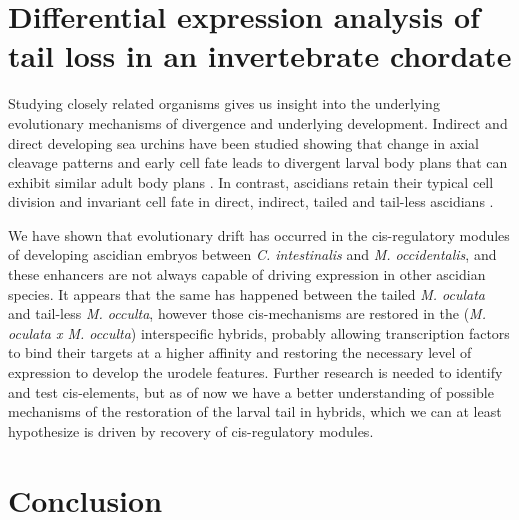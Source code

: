 \section{Differential expression analysis of tail loss in an invertebrate chordate}
Studying closely related organisms gives us insight into the underlying evolutionary mechanisms of divergence and underlying development. Indirect and direct developing sea urchins have been studied showing that change in axial cleavage patterns and early cell fate leads to divergent larval body plans that can exhibit similar adult body plans \cite{wray_evolutionary_1989,henry_evolutionary_1990}. In contrast, ascidians retain their typical cell division and invariant cell fate in direct, indirect, tailed and tail-less ascidians \cite{jeffery_evolutionary_1991,maliska_molgula_2010}. 
   
We have shown that evolutionary drift has occurred in the cis-regulatory modules of developing ascidian embryos between \textit{C. intestinalis} and \textit{M. occidentalis}, and these enhancers are not always capable of driving expression in other ascidian species. It appears that the same has happened between the tailed \textit{M. oculata} and tail-less \textit{M. occulta}, however those cis-mechanisms are restored in the (\textit{M. oculata x M. occulta}) interspecific hybrids, probably allowing transcription factors to bind their targets at a higher affinity and restoring the necessary level of expression to develop the urodele features. Further research is needed to identify and test cis-elements, but as of now we have a better understanding of possible mechanisms of the restoration of the larval tail in hybrids, which we can at least hypothesize is driven by recovery of cis-regulatory modules.

\section{Conclusion}

